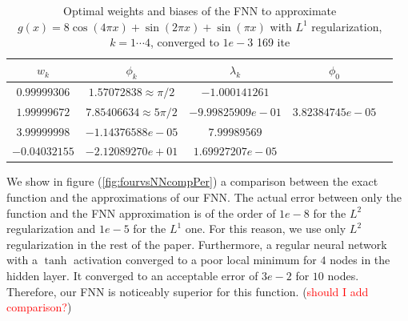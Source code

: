 \documentclass[11pt]{article}
\begin{document}
 \begin{table}[!h]
  \begin{center}
  \begin{tabular}{ |c|c|c|c|c| } 
\hline
$w_k$ & $\phi_k$ & $\lambda_k$& $\phi_0$ \\
\hline
$0.99999306$ & $1.57072838 \approx \pi/2$ &$-1.000141261$& \\ 
$1.99999672$&$7.85406634 \approx 5\pi/2$ & $-9.99825909e-01$& $3.82384745e-05$ \\ 
$3.99999998$& $-1.14376588e-05$ & $7.99989569$& \\ 
$ -0.04032155$& $-2.12089270e+01$ & $1.69927207e-05$& \\ 
\hline
\end{tabular}
\caption{Optimal weights and biases of the FNN to approximate $ g(x) = 8 \cos(4\pi x) + \sin(2\pi x) + \sin(\pi x)$ with $L^1$ regularization, $k = 1\cdots4$, converged to $1e-3$ 169 ite}\label{tabpercompL1}
\end{center}
\end{table}
We show in figure (\ref{fig:fourvsNNcompPer}) a comparison between the exact function and the approximations of our FNN. The actual error between only the function and the FNN approximation is of the order of $1e-8$ for the $L^2$ regularization and $1e-5$ for the $L^1$ one. For this reason, we use only $L^2$ regularization in the rest of the paper. Furthermore, a regular neural network with a $\tanh$ activation converged to a poor local minimum for $4$ nodes in the hidden layer. It converged to an acceptable error of $3e-2$ for $10$ nodes. Therefore, our FNN is noticeably superior for this function. (\textcolor{red}{should I add comparison?})
\end{document}
